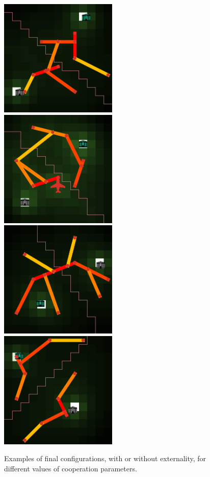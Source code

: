 \begin{figure}
\includegraphics[width=0.5\textwidth]{Figures/PartII/Modeling/Lutecia/ex_collab_0}
\includegraphics[width=0.5\textwidth]{Figures/PartII/Modeling/Lutecia/ex_dc_finalCollab}\\
\includegraphics[width=0.5\textwidth]{Figures/PartII/Modeling/Lutecia/ex_simpleNash_0}
\includegraphics[width=0.5\textwidth]{Figures/PartII/Modeling/Lutecia/example_nocollab_0}
\caption[Examples of final configurations]{Examples of final configurations, with or without externality, for different values of cooperation parameters.}
\label{fig:luteciaexample}
\end{figure}


